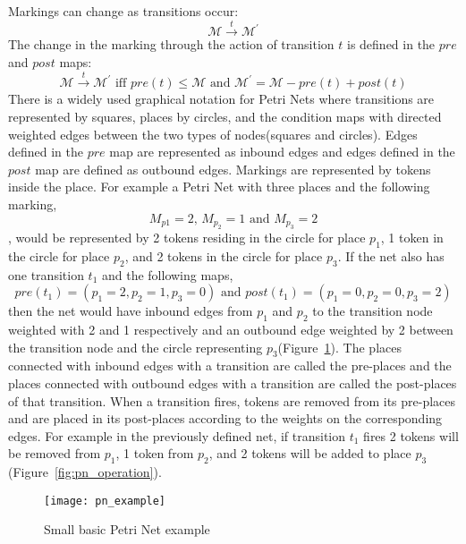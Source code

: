 Markings can change as transitions occur:
\begin{equation*}
\mathcal{M}\overset{t}{\longrightarrow}\mathcal{M^\prime}
\end{equation*}
The change in the marking through the action of transition $t$ is
defined in the $pre$ and $post$ maps:
\begin{equation*}
\mathcal{M}\overset{t}{\longrightarrow}\mathcal{M^\prime} \mbox{ iff } pre(t) \leq \mathcal{M} \mbox{ and } \mathcal{M^\prime} = \mathcal{M} - pre(t) + post(t)
\end{equation*}
There is a widely used graphical notation for Petri Nets where
transitions are represented by squares, places by circles, and the
condition maps with directed weighted edges between the two types of
nodes(squares and circles). Edges defined in the $pre$ map are
represented as inbound edges and edges defined in the $post$ map are
defined as outbound edges. Markings are represented by tokens inside
the place. For example a Petri Net with three places and the following
marking,
\begin{equation*}
M_{p1} = 2\mbox{, } M_{p_2}=1 \mbox{ and } M_{p_3} = 2
\end{equation*}
, would be represented by 2 tokens residing in the circle for place
$p_1$, 1 token in the circle for place $p_2$, and 2 tokens in the
circle for place $p_3$. If the net also has one transition $t_1$ and
the following maps,
\begin{equation*}
pre(t_1) = (p_1 = 2, p_2 = 1, p_3=0) \mbox{ and } post(t_1) = (p_1
=0, p_2=0, p_3=2)
\end{equation*}
then the net would have inbound edges from $p_1$ and $p_2$ to the
transition node weighted with 2 and 1 respectively and an outbound edge
weighted by 2 between the transition node and the circle representing
$p_3$(Figure~\ref{fig:pn_example}). The places connected with
inbound edges with a transition are called the pre-places and the
places connected with outbound edges with a transition are called the
post-places of that transition. When a transition fires, tokens are removed from its
pre-places and are placed in its post-places according to the weights
on the corresponding edges. For example in the previously defined net,
if transition $t_1$ fires 2 tokens will be removed from $p_1$, 1 token
from $p_2$, and 2 tokens will be added to place $p_3$(Figure~\ref{fig:pn_operation}).

\begin{figure}
\centering
\texttt{[image: pn\_example]}
\caption{Small basic Petri Net example}
\label{fig:pn_example}
\end{figure}

